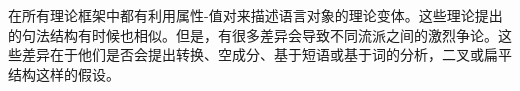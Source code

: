 在所有理论框架中都有利用属性-值对来描述语言对象的理论变体。这些理论提出的句法结构有时候也相似。但是，有很多差异会导致不同流派之间的激烈争论。这些差异在于他们是否会提出转换、空成分、基于短语或基于词的分析，二叉或扁平结构这样的假设。

